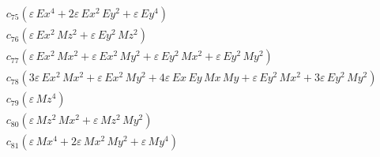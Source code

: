 \documentclass{article}
\begin{document}
\begin{align*}
  &\quad c_{75} \left(ε\,Ex^{4} + 2ε\,Ex^{2}\,Ey^{2} + ε\,Ey^{4}\right) \\
  &\quad c_{76} \left(ε\,Ex^{2}\,Mz^{2} + ε\,Ey^{2}\,Mz^{2}\right) \\
  &\quad c_{77} \left(ε\,Ex^{2}\,Mx^{2} + ε\,Ex^{2}\,My^{2} + ε\,Ey^{2}\,Mx^{2} + ε\,Ey^{2}\,My^{2}\right) \\
  &\quad c_{78} \left(3ε\,Ex^{2}\,Mx^{2} + ε\,Ex^{2}\,My^{2} + 4ε\,Ex\,Ey\,Mx\,My + ε\,Ey^{2}\,Mx^{2} + 3ε\,Ey^{2}\,My^{2}\right) \\
  &\quad c_{79} \left(ε\,Mz^{4}\right) \\
  &\quad c_{80} \left(ε\,Mz^{2}\,Mx^{2} + ε\,Mz^{2}\,My^{2}\right) \\
  &\quad c_{81} \left(ε\,Mx^{4} + 2ε\,Mx^{2}\,My^{2} + ε\,My^{4}\right)
\end{align*}
\end{document}
